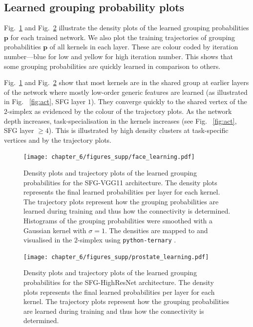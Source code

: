 \subsection{Learned grouping probability plots}
Fig.~\ref{fig:fig_learned_A} and Fig.~\ref{fig:fig_learned_B} illustrate the density plots of the learned grouping probabilities $\mathbf{p}$ for each trained network. We also plot the training trajectories of grouping probabilities $\mathbf{p}$ of all kernels in each layer. These are colour coded by iteration number---blue for low and yellow for high iteration number. This shows that some grouping probabilities are quickly learned in comparison to others. 

Fig.~\ref{fig:fig_learned_A} and Fig.~\ref{fig:fig_learned_B} show that most kernels are in the shared group at earlier layers of the network where mostly low-order generic features are learned (as illustrated in Fig.~ \ref{fig:act}, SFG layer $1$). They converge quickly to the shared vertex of the $2$-simplex as evidenced by the colour of the trajectory plots. As the network depth increases, task-specialisation in the kernels increases (see Fig.~ \ref{fig:act}, SFG layer $\ge4$). This is illustrated by high density clusters at task-specific vertices and by the trajectory plots.

\begin{figure}[ht!]
	\centering
	\texttt{[image: chapter\_6/figures\_supp/face\_learning.pdf]}
	\caption{Density plots and trajectory plots of the learned grouping probabilities for the SFG-VGG11 architecture. The density plots represents the final learned probabilities per layer for each kernel. The trajectory plots represent how the grouping probabilities are learned during training and thus how the connectivity is determined. Histograms of the grouping probabilities were smoothed with a Gaussian kernel with $\sigma=1$. The densities are mapped to and visualised in the $2$-simplex using \texttt{python-ternary} \cite{ternary}.}
	\label{fig:fig_learned_A}
\end{figure}

\begin{figure}[h]
	\centering
	\texttt{[image: chapter\_6/figures\_supp/prostate\_learning.pdf]}
	\caption{Density plots and trajectory plots of the learned grouping probabilities for the SFG-HighResNet architecture. The density plots represents the final learned probabilities per layer for each kernel. The trajectory plots represent how the grouping probabilities are learned during training and thus how the connectivity is determined.}
	\label{fig:fig_learned_B}
\end{figure}



